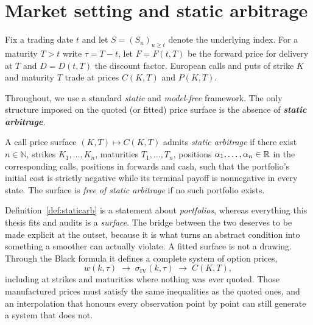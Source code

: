 \section{Market setting and static arbitrage}\label{sec:setting}

Fix a trading date $t$ and let $S=(S_u)_{u\ge t}$ denote the underlying index. For a maturity $T>t$ write $\tau=T-t$, let $F=F(t,T)$ be the forward price for delivery at $T$ and $D=D(t,T)$ the discount factor. European calls and puts of strike $K$ and maturity $T$ trade at prices $C(K,T)$ and $P(K,T)$.

Throughout, we use a standard \emph{static} and \emph{model-free} framework. The only structure imposed on the quoted (or fitted) price surface is the absence of \textbf{\emph{static arbitrage}}.

\begin{definition}\label{def:staticarb}
A call price surface $(K,T)\mapsto C(K,T)$ admits \emph{static arbitrage} if there exist
$n\in\mathbb N$, strikes $K_1,\dots,K_n$, maturities $T_1,\dots,T_n$, positions
$\alpha_1,\dots,\alpha_n\in\mathbb{R}$ in the corresponding calls, positions in forwards and cash, such
that the portfolio's initial cost is strictly negative while its terminal payoff is nonnegative
in every state. The surface is \emph{free of static arbitrage} if no such portfolio exists.
\end{definition}

Definition~\ref{def:staticarb} is a statement about \emph{portfolios}, whereas everything this
thesis fits and audits is a \emph{surface}. The bridge between the two deserves to be made
explicit at the outset, because it is what turns an abstract condition into something a smoother
can actually violate. A fitted surface is not a drawing. Through the Black formula it defines a
complete system of option prices,
\[
w(k,\tau)\;\longrightarrow\;\sigma_{\mathrm{IV}}(k,\tau)\;\longrightarrow\;C(K,T),
\]
including at strikes and maturities where nothing was ever quoted. Those manufactured prices
must satisfy the same inequalities as the quoted ones, and an interpolation that honours every
observation point by point can still generate a system that does not.

